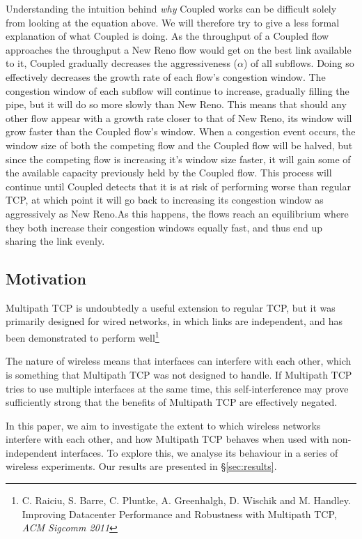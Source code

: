 Understanding the intuition behind \textit{why} Coupled works can be difficult
solely from looking at the equation above. We will therefore try to give a less formal
 explanation of what Coupled is doing. As the throughput of a Coupled
flow approaches the throughput a New Reno flow would get on the best link
available to it, Coupled gradually decreases the aggressiveness ($\alpha$)
of all subflows. Doing so effectively decreases the growth rate of each flow's
congestion window. The congestion window of each subflow will continue to increase,
gradually filling the pipe, but it will do so more slowly than New Reno. This means that
should any other flow appear with a growth rate closer to that of New Reno, its
window will grow faster than the Coupled flow's window. When a congestion event
occurs, the window size of both the competing flow and the Coupled
flow will be halved, but since the competing flow is increasing it's window size faster,
it will gain some of the available capacity previously held by the Coupled flow.
This process will continue until Coupled detects that it is at risk of
performing worse than regular TCP, at which point it will go back to increasing its
congestion window as aggressively as New Reno.\@ As this happens, the flows
reach an equilibrium where they both increase their congestion windows equally
fast, and thus end up sharing the link evenly.

\subsection{Motivation}
\label{sec:bg:motivation}
Multipath TCP is undoubtedly a useful extension to regular TCP, but it was
primarily designed for wired networks, in which links are independent, and
has been demonstrated to perform
well\footnote{C. Raiciu, S. Barre, C. Pluntke, A. Greenhalgh, 
D. Wischik and M. Handley. Improving Datacenter Performance and Robustness with 
Multipath TCP, \textit{ACM Sigcomm 2011}}

The nature of wireless means that interfaces can interfere with each
other, which is something that Multipath TCP was not designed to handle.
If Multipath TCP
tries to use multiple interfaces at the same time, this self-interference may
prove sufficiently strong that the benefits of Multipath TCP are effectively
negated.

In this paper, we aim to investigate the extent to which wireless networks
interfere with each other, and how Multipath TCP behaves when used with
non-independent interfaces. To explore this, we analyse its behaviour in a
series of wireless experiments. Our results are presented in
\S\ref{sec:results}.

